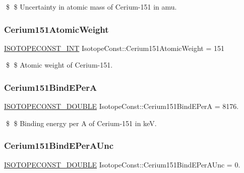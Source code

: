 \$ \$ Uncertainty in atomic mass of Cerium-\/151 in amu. \mbox{\label{group___isotope_const-_cerium-_ce151_gaa4a4af77a725a97e6335791eb61b7a08}} 
\subsubsection{\texorpdfstring{Cerium151\+Atomic\+Weight}{Cerium151AtomicWeight}}
{\footnotesize\ttfamily \mbox{\hyperlink{group___isotope_const-_macros_ga5f18360b3e99483a35c32d789e62621c}{I\+S\+O\+T\+O\+P\+E\+C\+O\+N\+S\+T\+\_\+\+I\+NT}} Isotope\+Const\+::\+Cerium151\+Atomic\+Weight = 151}

\$ \$ Atomic weight of Cerium-\/151. \mbox{\label{group___isotope_const-_cerium-_ce151_gace4a82d7b38d946f6e0b028aaa6c7e3c}} 
\subsubsection{\texorpdfstring{Cerium151\+Bind\+E\+PerA}{Cerium151BindEPerA}}
{\footnotesize\ttfamily \mbox{\hyperlink{group___isotope_const-_macros_ga8f45a7272ce02c0b4c65c44636ed719a}{I\+S\+O\+T\+O\+P\+E\+C\+O\+N\+S\+T\+\_\+\+D\+O\+U\+B\+LE}} Isotope\+Const\+::\+Cerium151\+Bind\+E\+PerA = 8176.}

\$ \$ Binding energy per A of Cerium-\/151 in keV. \mbox{\label{group___isotope_const-_cerium-_ce151_ga331ba09f41755a72d3f4018a04d1c1fd}} 
\subsubsection{\texorpdfstring{Cerium151\+Bind\+E\+Per\+A\+Unc}{Cerium151BindEPerAUnc}}
{\footnotesize\ttfamily \mbox{\hyperlink{group___isotope_const-_macros_ga8f45a7272ce02c0b4c65c44636ed719a}{I\+S\+O\+T\+O\+P\+E\+C\+O\+N\+S\+T\+\_\+\+D\+O\+U\+B\+LE}} Isotope\+Const\+::\+Cerium151\+Bind\+E\+Per\+A\+Unc = 0.}

